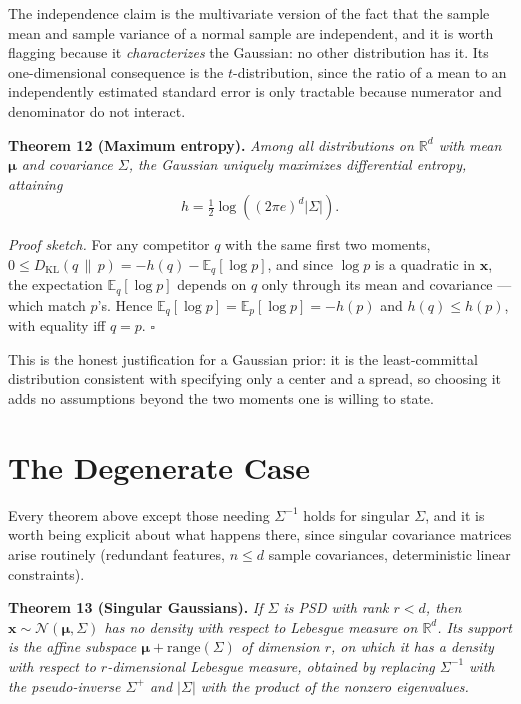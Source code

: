 \documentclass[conference]{IEEEtran}
\begin{document}
\medskip
The independence claim is the multivariate version of the fact that the sample mean and sample variance of a normal sample are independent, and it is worth flagging because it \textit{characterizes} the Gaussian: no other distribution has it. Its one-dimensional consequence is the $t$-distribution, since the ratio of a mean to an independently estimated standard error is only tractable because numerator and denominator do not interact.

\medskip
\noindent\textbf{Theorem 12 (Maximum entropy).}
\textit{Among all distributions on $\mathbb{R}^d$ with mean $\boldsymbol{\mu}$ and covariance $\Sigma$, the Gaussian uniquely maximizes differential entropy, attaining}
\begin{equation}
    h = \tfrac{1}{2}\log\!\left((2\pi e)^d |\Sigma|\right).
\end{equation}

\medskip
\textit{Proof sketch.} For any competitor $q$ with the same first two moments, $0 \leq D_{\mathrm{KL}}(q \,\|\, p) = -h(q) - \mathbb{E}_q[\log p]$, and since $\log p$ is a quadratic in $\mathbf{x}$, the expectation $\mathbb{E}_q[\log p]$ depends on $q$ only through its mean and covariance --- which match $p$'s. Hence $\mathbb{E}_q[\log p] = \mathbb{E}_p[\log p] = -h(p)$ and $h(q) \leq h(p)$, with equality iff $q = p$. $\square$

\medskip
This is the honest justification for a Gaussian prior: it is the least-committal distribution consistent with specifying only a center and a spread, so choosing it adds no assumptions beyond the two moments one is willing to state.

\section*{The Degenerate Case}
Every theorem above except those needing $\Sigma^{-1}$ holds for singular $\Sigma$, and it is worth being explicit about what happens there, since singular covariance matrices arise routinely (redundant features, $n \leq d$ sample covariances, deterministic linear constraints).

\medskip
\noindent\textbf{Theorem 13 (Singular Gaussians).}
\textit{If $\Sigma$ is PSD with rank $r < d$, then $\mathbf{x} \sim \mathcal{N}(\boldsymbol{\mu},\Sigma)$ has no density with respect to Lebesgue measure on $\mathbb{R}^d$. Its support is the affine subspace $\boldsymbol{\mu} + \mathrm{range}(\Sigma)$ of dimension $r$, on which it has a density with respect to $r$-dimensional Lebesgue measure, obtained by replacing $\Sigma^{-1}$ with the pseudo-inverse $\Sigma^{+}$ and $|\Sigma|$ with the product of the nonzero eigenvalues.}
\end{document}
